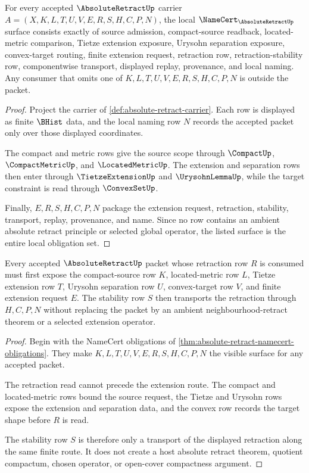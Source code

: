 \begin{theorem}\label{thm:absolute-retract-namecert-obligations}
For every accepted $\AbsoluteRetractUp$ carrier $A=(X,K,L,T,U,V,E,R,S,H,C,P,N)$, the local $\NameCert_{\AbsoluteRetractUp}$ surface consists exactly of source admission, compact-source readback, located-metric comparison, Tietze extension exposure, Urysohn separation exposure, convex-target routing, finite extension request, retraction row, retraction-stability row, componentwise transport, displayed replay, provenance, and local naming. Any consumer that omits one of $K,L,T,U,V,E,R,S,H,C,P,N$ is outside the packet.
\end{theorem}
\begin{proof}
Project the carrier of \autoref{def:absolute-retract-carrier}. Each row is displayed as finite $\BHist$ data, and the local naming row $N$ records the accepted packet only over those displayed coordinates.

The compact and metric rows give the source scope through $\CompactUp$, $\CompactMetricUp$, and $\LocatedMetricUp$. The extension and separation rows then enter through $\TietzeExtensionUp$ and $\UrysohnLemmaUp$, while the target constraint is read through $\ConvexSetUp$.

Finally, $E,R,S,H,C,P,N$ package the extension request, retraction, stability, transport, replay, provenance, and name. Since no row contains an ambient absolute retract principle or selected global operator, the listed surface is the entire local obligation set.
\end{proof}

\begin{theorem}\label{thm:absolute-retract-retraction-stability}
Every accepted $\AbsoluteRetractUp$ packet whose retraction row $R$ is consumed must first expose the compact-source row $K$, located-metric row $L$, Tietze extension row $T$, Urysohn separation row $U$, convex-target row $V$, and finite extension request $E$. The stability row $S$ then transports the retraction through $H,C,P,N$ without replacing the packet by an ambient neighbourhood-retract theorem or a selected extension operator.
\end{theorem}
\begin{proof}
Begin with the NameCert obligations of \autoref{thm:absolute-retract-namecert-obligations}. They make $K,L,T,U,V,E,R,S,H,C,P,N$ the visible surface for any accepted packet.

The retraction read cannot precede the extension route. The compact and located-metric rows bound the source request, the Tietze and Urysohn rows expose the extension and separation data, and the convex row records the target shape before $R$ is read.

The stability row $S$ is therefore only a transport of the displayed retraction along the same finite route. It does not create a host absolute retract theorem, quotient compactum, chosen operator, or open-cover compactness argument.
\end{proof}

